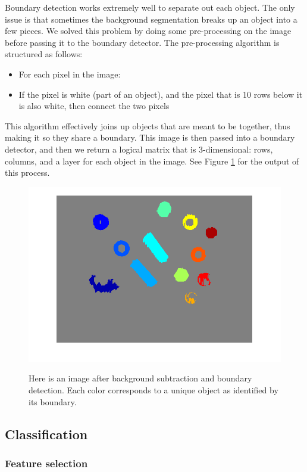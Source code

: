\documentclass[12pt]{article}
\begin{document}
Boundary detection works extremely well to separate out each object. The only issue is that sometimes the background segmentation breaks up an object into a few pieces. We solved this problem by doing some pre-processing on the image before passing it to the boundary detector. The pre-processing algorithm is structured as follows:
\begin{itemize}
	\item For each pixel in the image:
	\item If the pixel is white (part of an object), and the pixel that is 10 rows below it is also white, then connect the two pixels
\end{itemize}
This algorithm effectively joins up objects that are meant to be together, thus making it so they share a boundary. This image is then passed into a boundary detector, and then we return a logical matrix that is 3-dimensional: rows, columns, and a layer for each object in the image. See Figure \ref{bound} for the output of this process.

\begin{figure}
	\centering
	\includegraphics[width=0.8\linewidth]{boundary}
	\label{bound}
	\caption{Here is an image after background subtraction and boundary detection. Each color corresponds to a unique object as identified by its boundary.}
\end{figure}

\subsection{Classification}

\subsubsection{Feature selection}
\end{document}
